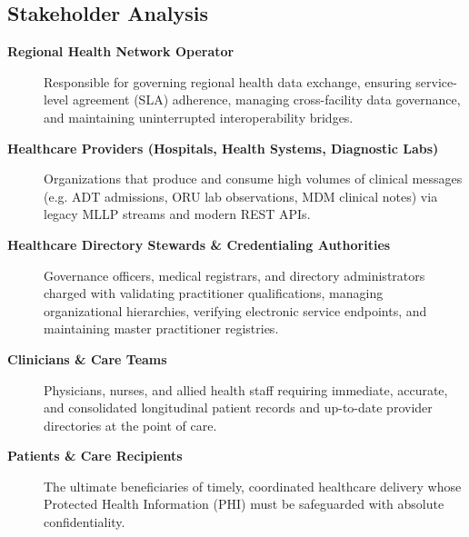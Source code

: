 \subsection{Stakeholder Analysis}
\begin{description}
    \item[\textbf{Regional Health Network Operator}] Responsible for governing regional health data exchange, ensuring service-level agreement (SLA) adherence, managing cross-facility data governance, and maintaining uninterrupted interoperability bridges.

    \item[\textbf{Healthcare Providers (Hospitals, Health Systems, Diagnostic Labs)}] Organizations that produce and consume high volumes of clinical messages (e.g. ADT admissions, ORU lab observations, MDM clinical notes) via legacy MLLP streams and modern REST APIs.

    \item[\textbf{Healthcare Directory Stewards \& Credentialing Authorities}] Governance officers, medical registrars, and directory administrators charged with validating practitioner qualifications, managing organizational hierarchies, verifying electronic service endpoints, and maintaining master practitioner registries.

    \item[\textbf{Clinicians \& Care Teams}] Physicians, nurses, and allied health staff requiring immediate, accurate, and consolidated longitudinal patient records and up-to-date provider directories at the point of care.

    \item[\textbf{Patients \& Care Recipients}] The ultimate beneficiaries of timely, coordinated healthcare delivery whose Protected Health Information (PHI) must be safeguarded with absolute confidentiality.
\end{description}


